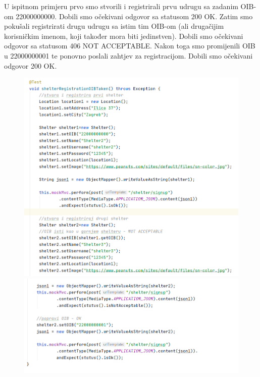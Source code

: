 			U ispitnom primjeru prvo smo stvorili i registrirali prvu udrugu sa zadanim OIB-om 22000000000. Dobili smo očekivani odgovor sa statusom 200 OK. Zatim smo pokušali registrirati drugu udrugu sa istim tim OIB-om (ali drugačijim korisničkim imenom, koji također mora biti jedinstven). Dobili smo očekivani odgovor sa statusom 406 NOT ACCEPTABLE. Nakon toga smo promijenili OIB u 22000000001 te ponovno poslali zahtjev za registracijom. Dobili smo očekivani odgovor 200 OK.
			\begin{figure}[H]
				\centerline{
					\includegraphics[scale=0.73]{slike/shelter1.1.PNG}}
				\hspace*{-0.21in}
				\includegraphics[scale=0.73]{slike/shelter1.2.PNG}
				\centering
			\end{figure}
			
